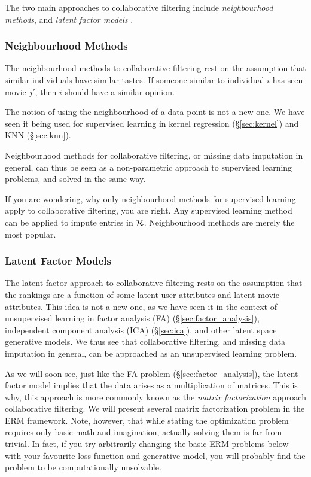 The two main approaches to collaborative filtering include \emph{neighbourhood methods}, and \emph{latent factor models} \cite{koren_matrix_2009}.

\subsubsection{Neighbourhood Methods}
The neighbourhood methods to collaborative filtering rest on the assumption that similar individuals have similar tastes. 
If someone similar to individual $i$ has seen movie $j'$, then $i$ should have a similar opinion.

The notion of using the neighbourhood of a data point is not a new one. We have seen it being used for supervised learning in kernel regression (\S\ref{sec:kernel}) and KNN (\S\ref{sec:knn}).

Neighbourhood methods for collaborative filtering, or missing data imputation in general, can thus be seen as a non-parametric approach to supervised learning problems, and solved in the same way.


\begin{remark}
If you are wondering, why only neighbourhood methods for supervised learning apply to collaborative filtering, you are right.
Any supervised learning method can be applied to impute entries in $\mathcal{R}$. Neighbourhood 
methods are merely the most popular.
\end{remark}


\subsubsection{Latent Factor Models}
The latent factor approach to collaborative filtering rests on the assumption that the rankings are a function of some latent user attributes and latent movie attributes. 
This idea is not a new one, as we have seen it in the context of unsupervised learning in factor analysis (FA) (\S\ref{sec:factor_analysis}), independent component analysis (ICA) (\S\ref{sec:ica}), and other latent space generative models.
We thus see that collaborative filtering, and missing data imputation in general, can be approached as an unsupervised learning problem. 

As we will soon see, just like the FA problem (\S\ref{sec:factor_analysis}), the latent factor model implies that the data arises as a multiplication of matrices. This is why, this approach is more commonly known as the \emph{matrix factorization} approach collaborative filtering.
We will present several matrix factorization problem in the ERM framework.
Note, however, that while stating the optimization problem requires only basic math and imagination, actually solving them is far from trivial. In fact, if you try arbitrarily changing the basic ERM problems below with your favourite loss function and generative model, you will probably find the problem to be computationally unsolvable. 

